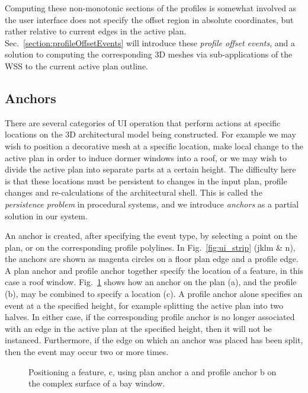 Computing these non-monotonic sections of the profiles is somewhat involved as the user interface does not specify the offset region in absolute coordinates, but rather relative to current edges in the active plan. Sec.~\ref{section:profileOffsetEvents} will introduce these \emph{profile offset events}, and a solution to computing the corresponding 3D meshes via sub-applications of the WSS to the current active plan outline.

\FloatBarrier
\subsection{Anchors}

There are several categories of UI operation that perform actions at specific locations on the 3D architectural model being constructed. For example we may wish to position a decorative mesh at a specific location, make local change to the active plan in order to induce dormer windows into a roof, or we may wish to divide the active plan into separate parts at a certain height. The difficulty here is that these locations must be persistent to changes in the input plan, profile changes and re-calculations of the architectural shell. This is called the \emph{persistence problem} in procedural systems\cite{Lipp:2008:IEV}, and we introduce \emph{anchors} as a partial solution in our system.
 
An anchor is created, after specifying the event type, by selecting a point on the plan, or on the corresponding profile polylines. In Fig.~\ref{fig:ui_strip} (jklm \& n), the anchors are shown as magenta circles on a floor plan edge and a profile edge. A plan anchor and profile anchor together specify the location of a feature, in this case a roof window. Fig.~\ref{fig:Marker_Product} shows how an anchor on the plan (a), and the profile (b), may be combined to specify a location (c). A profile anchor alone specifies an event at a the specified height, for example splitting the active plan into two halves. In either case, if the corresponding profile anchor is no longer associated with an edge in the active plan at the specified height, then it will not be instanced. Furthermore, if the edge on which an anchor was placed has been split, then the event may occur two or more times.

\begin{figure}
  \centering
  \def\svgwidth{0.6\columnwidth}
  
  \caption[An example of anchors]{\label{fig:Marker_Product} Positioning a feature, c, using plan anchor a and profile anchor b on the complex surface of a bay window.}
\end{figure}


